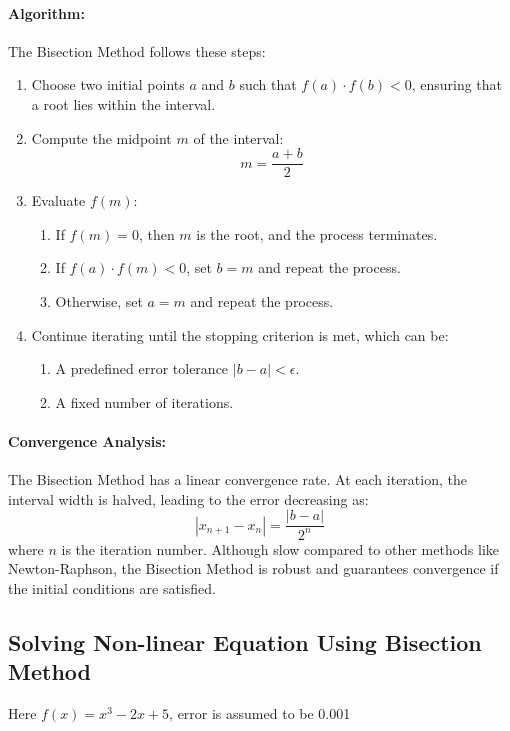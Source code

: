 \documentclass[a4paper,12pt]{article}
\begin{document}
	\paragraph{Algorithm:}
	The Bisection Method follows these steps:
	\begin{enumerate}
		\item Choose two initial points \( a \) and \( b \) such that \( f(a) \cdot f(b) < 0 \), ensuring that a root lies within the interval.
		\item Compute the midpoint \( m \) of the interval:
		\begin{equation}
			m = \frac{a + b}{2}
		\end{equation}
		\item Evaluate \( f(m) \):
		\begin{enumerate}
			\item If \( f(m) = 0 \), then \( m \) is the root, and the process terminates.
			\item If \( f(a) \cdot f(m) < 0 \), set \( b = m \) and repeat the process.
			\item Otherwise, set \( a = m \) and repeat the process.
		\end{enumerate}
		\item Continue iterating until the stopping criterion is met, which can be:
		\begin{enumerate}
			\item A predefined error tolerance \( |b - a| < \epsilon \).
			\item A fixed number of iterations.
		\end{enumerate}
	\end{enumerate}
	
	\paragraph{Convergence Analysis:}
	The Bisection Method has a linear convergence rate. At each iteration, the interval width is halved, leading to the error decreasing as:
	\begin{equation}
		|x_{n+1} - x_n| = \frac{|b - a|}{2^n}
	\end{equation}
	where \( n \) is the iteration number. Although slow compared to other methods like Newton-Raphson, the Bisection Method is robust and guarantees convergence if the initial conditions are satisfied.
	

	
	
	
	\subsection{Solving Non-linear Equation Using Bisection Method}
	Here $f(x) = x^3 - 2x + 5$, 
	error is assumed to be 0.001 
\end{document}
